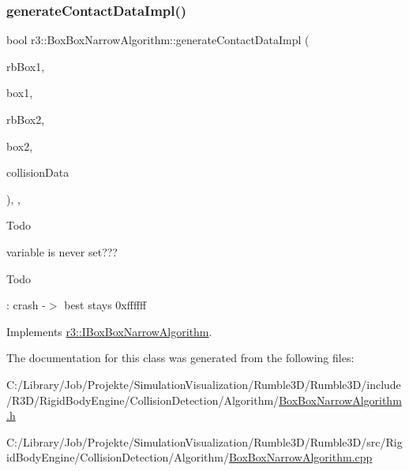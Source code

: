 \subsubsection{\texorpdfstring{generate\+Contact\+Data\+Impl()}{generateContactDataImpl()}}
{\footnotesize\ttfamily bool r3\+::\+Box\+Box\+Narrow\+Algorithm\+::generate\+Contact\+Data\+Impl (\begin{DoxyParamCaption}\item[{\mbox{\hyperlink{classr3_1_1_rigid_body}{Rigid\+Body}} $\ast$}]{rb\+Box1,  }\item[{\mbox{\hyperlink{classr3_1_1_collision_box}{Collision\+Box}} $\ast$}]{box1,  }\item[{\mbox{\hyperlink{classr3_1_1_rigid_body}{Rigid\+Body}} $\ast$}]{rb\+Box2,  }\item[{\mbox{\hyperlink{classr3_1_1_collision_box}{Collision\+Box}} $\ast$}]{box2,  }\item[{\mbox{\hyperlink{classr3_1_1_collision_data}{Collision\+Data}} \&}]{collision\+Data }\end{DoxyParamCaption})\hspace{0.3cm}{\ttfamily [override]}, {\ttfamily [protected]}, {\ttfamily [virtual]}}

\begin{DoxyRefDesc}{Todo}
\item[\mbox{\hyperlink{todo__todo000012}{Todo}}]variable is never set??? \end{DoxyRefDesc}


\begin{DoxyRefDesc}{Todo}
\item[\mbox{\hyperlink{todo__todo000013}{Todo}}]\+: crash -\/$>$ best stays 0xffffff \end{DoxyRefDesc}


Implements \mbox{\hyperlink{classr3_1_1_i_box_box_narrow_algorithm_abc15898100b5ed0537e4c6ccc6610069}{r3\+::\+I\+Box\+Box\+Narrow\+Algorithm}}.



The documentation for this class was generated from the following files\+:\begin{DoxyCompactItemize}
\item 
C\+:/\+Library/\+Job/\+Projekte/\+Simulation\+Visualization/\+Rumble3\+D/\+Rumble3\+D/include/\+R3\+D/\+Rigid\+Body\+Engine/\+Collision\+Detection/\+Algorithm/\mbox{\hyperlink{_box_box_narrow_algorithm_8h}{Box\+Box\+Narrow\+Algorithm.\+h}}\item 
C\+:/\+Library/\+Job/\+Projekte/\+Simulation\+Visualization/\+Rumble3\+D/\+Rumble3\+D/src/\+Rigid\+Body\+Engine/\+Collision\+Detection/\+Algorithm/\mbox{\hyperlink{_box_box_narrow_algorithm_8cpp}{Box\+Box\+Narrow\+Algorithm.\+cpp}}\end{DoxyCompactItemize}
